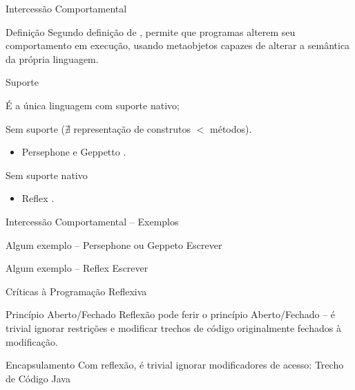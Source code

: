 \documentclass[12pt,t]{beamer}
\begin{document}
 	 \begin{frame}{Intercessão Comportamental}
 	 	\begin{block}{Definição}
 	 		Segundo definição de , permite que programas alterem seu comportamento em execução, usando metaobjetos capazes de alterar a semântica da própria linguagem.
 	 	\end{block} 	 	 	 	
 		\begin{block}{Suporte}
 			\begin{description}  [Smalltalk:] 
	 			\item [CLOS] É a única linguagem com suporte nativo;
	 			\item [Smalltalk:] Sem suporte ($\nexists$ representação de construtos $<$ métodos). 
	 			\begin{itemize}
	 				\item Persephone e Geppetto \cite{marschall2006taking,rothlisberger2006geppetto}.
	 			\end{itemize}
	 			\item [Java:] Sem suporte nativo
	 			\begin{itemize}
	 				\item Reflex \cite{tanter2001reflex}.
	 			\end{itemize}
	 		\end{description}
 	 	\end{block} 	 	 	 	
 	 \end{frame}
 	 \begin{frame}{Intercessão Comportamental -- Exemplos}
 	 	\begin{exampleblock}{Algum exemplo -- Persephone ou Geppeto}
 	 		\alert{Escrever}
 	 	\end{exampleblock}
 	 	\begin{exampleblock}{Algum exemplo -- Reflex}
 	 		\alert{Escrever}
 	 	\end{exampleblock}
 	 \end{frame} 	 
 	 \begin{frame}{Críticas à Programação Reflexiva}
 	 	\begin{block}{Princípio Aberto/Fechado}
 	 		Reflexão pode ferir o princípio Aberto/Fechado \cite{meyer1988object} -- é trivial ignorar restrições e modificar trechos de código originalmente fechados à modificação.
 	 	\end{block}
 	 	\begin{block}{Encapsulamento}
 	 		Com reflexão, é trivial ignorar modificadores de acesso:
 	 		\alert{Trecho de Código Java} 
 	 	\end{block}
 	 \end{frame}
\end{document}
